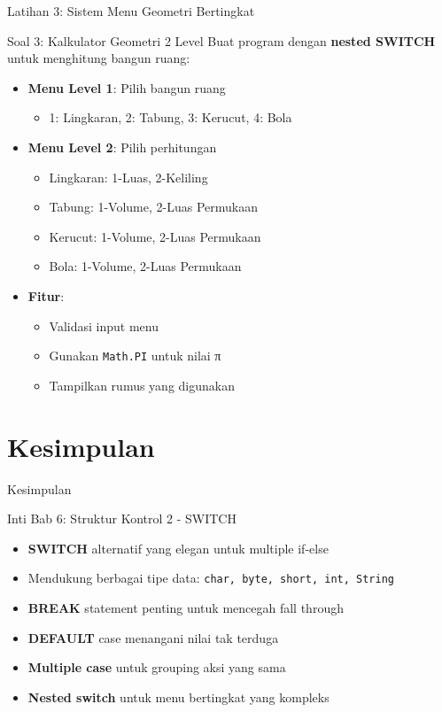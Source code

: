 \documentclass{beamer}
\begin{document}
\begin{frame}{Latihan 3: Sistem Menu Geometri Bertingkat}
  \begin{block}{Soal 3: Kalkulator Geometri 2 Level}
    Buat program dengan \textbf{nested SWITCH} untuk menghitung bangun ruang:
    \begin{itemize}
      \item \textbf{Menu Level 1}: Pilih bangun ruang
        \begin{itemize}
          \item 1: Lingkaran, 2: Tabung, 3: Kerucut, 4: Bola
        \end{itemize}
      \item \textbf{Menu Level 2}: Pilih perhitungan
        \begin{itemize}
          \item Lingkaran: 1-Luas, 2-Keliling
          \item Tabung: 1-Volume, 2-Luas Permukaan
          \item Kerucut: 1-Volume, 2-Luas Permukaan  
          \item Bola: 1-Volume, 2-Luas Permukaan
        \end{itemize}
      \item \textbf{Fitur}: 
        \begin{itemize}
          \item Validasi input menu
          \item Gunakan \texttt{Math.PI} untuk nilai π
          \item Tampilkan rumus yang digunakan
        \end{itemize}
    \end{itemize}
  \end{block}
\end{frame}

\section{Kesimpulan}
\begin{frame}{Kesimpulan}
  \begin{alertblock}{Inti Bab 6: Struktur Kontrol 2 - SWITCH}
    \begin{itemize}
      \item \textbf{SWITCH} alternatif yang elegan untuk multiple if-else
      \item Mendukung berbagai tipe data: \texttt{char, byte, short, int, String}
      \item \textbf{BREAK} statement penting untuk mencegah fall through
      \item \textbf{DEFAULT} case menangani nilai tak terduga
      \item \textbf{Multiple case} untuk grouping aksi yang sama
      \item \textbf{Nested switch} untuk menu bertingkat yang kompleks
    \end{itemize}
  \end{alertblock}
\end{frame}
\end{document}
